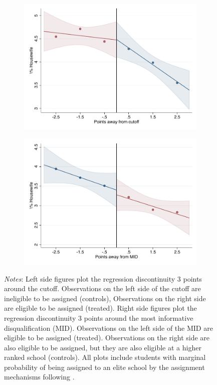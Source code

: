 \documentclass[oneside,11pt]{article}
\begin{document}
\begin{figure}[H]
\begin{center}
    \begin{subfigure}{0.475\textwidth}
        \centering
        \includegraphics[width=\textwidth]{04_Figures/rd_plot_tau_Housewife_IPN3.pdf}
    \end{subfigure}
    \begin{subfigure}{0.475\textwidth}
        \centering
        \includegraphics[width=\textwidth]{04_Figures/rd_plot_mid_Housewife_IPN3.pdf}
    \end{subfigure}
    \end{center}
    
\footnotesize
\textit{Notes}: Left side figures plot the regression discontinuity 3 points around the cutoff. Observations on the left side of the cutoff are ineligible to be assigned (controls), Observations on the right side are eligible to be assigned (treated). Right side figures plot the regression discontinuity 3 points around the most informative disqualification (MID). Observations on the left side of the MID are eligible to be assigned (treated). Observations on the right side are also eligible to be assigned, but they are also eligible at a higher ranked school (controls). All plots include students with marginal probability of being assigned to an elite school by the assignment mechanisms following \citet{abdulkadirouglu2022breaking}. 
\end{figure}
\end{document}
